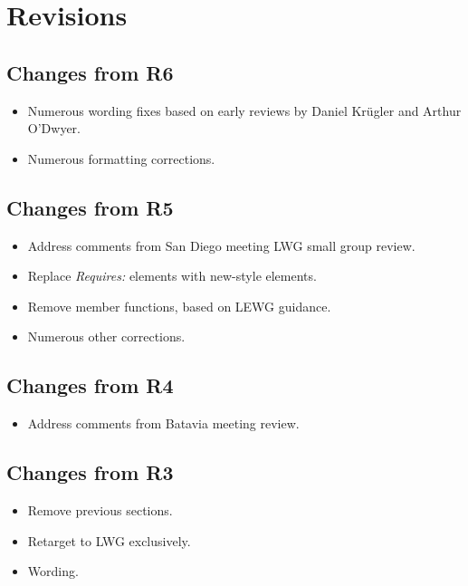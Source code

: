\section{Revisions}

\subsection{Changes from R6}

\begin{itemize}
  \item Numerous wording fixes based on early reviews by Daniel Kr{\"u}gler and Arthur O'Dwyer.
  \item Numerous formatting corrections.
\end{itemize}

\subsection{Changes from R5}

\begin{itemize}
  \item Address comments from San Diego meeting LWG small group review.
  \item Replace \textit{Requires:} elements with new-style elements.
  \item Remove  member functions, based on LEWG guidance.
  \item Numerous other corrections.
\end{itemize}

\subsection{Changes from R4}

\begin{itemize}
  \item Address comments from Batavia meeting review.
\end{itemize}

\subsection{Changes from R3}

\begin{itemize}
  \item Remove previous sections.
  \item Retarget to LWG exclusively.
  \item Wording.
\end{itemize}

